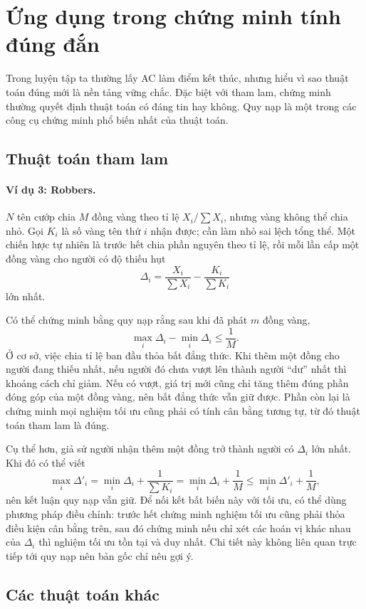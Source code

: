 \documentclass[11pt]{article}
\begin{document}
\section{Ứng dụng trong chứng minh tính đúng đắn}

Trong luyện tập ta thường lấy AC làm điểm kết thúc, nhưng hiểu vì sao thuật
toán đúng mới là nền tảng vững chắc. Đặc biệt với tham lam, chứng minh thường
quyết định thuật toán có đáng tin hay không. Quy nạp là một trong các công cụ
chứng minh phổ biến nhất của thuật toán.

\subsection{Thuật toán tham lam}

\paragraph{Ví dụ 3: Robbers.}
\(N\) tên cướp chia \(M\) đồng vàng theo tỉ lệ \(X_i/\sum X_i\), nhưng vàng
không thể chia nhỏ. Gọi \(K_i\) là số vàng tên thứ \(i\) nhận được; cần làm
nhỏ sai lệch tổng thể. Một chiến lược tự nhiên là trước hết chia phần nguyên
theo tỉ lệ, rồi mỗi lần cấp một đồng vàng cho người có độ thiếu hụt
\[
  \Delta_i=\frac{X_i}{\sum X_i}-\frac{K_i}{\sum K_i}
\]
lớn nhất.

Có thể chứng minh bằng quy nạp rằng sau khi đã phát \(m\) đồng vàng,
\[
  \max_i\Delta_i-\min_i\Delta_i\le \frac1M.
\]
Ở cơ sở, việc chia tỉ lệ ban đầu thỏa bất đẳng thức. Khi thêm một đồng cho
người đang thiếu nhất, nếu người đó chưa vượt lên thành người ``dư'' nhất thì
khoảng cách chỉ giảm. Nếu có vượt, giá trị mới cũng chỉ tăng thêm đúng phần
đóng góp của một đồng vàng, nên bất đẳng thức vẫn giữ được. Phần còn lại là
chứng minh mọi nghiệm tối ưu cũng phải có tính cân bằng tương tự, từ đó thuật
toán tham lam là đúng.

Cụ thể hơn, giả sử người nhận thêm một đồng trở thành người có
\(\Delta_i\) lớn nhất. Khi đó có thể viết
\[
  \max_i\Delta'_i
  =\min_i\Delta_i+\frac1{\sum K_i}
  =\min_i\Delta_i+\frac1M
  \le \min_i\Delta'_i+\frac1M,
\]
nên kết luận quy nạp vẫn giữ. Để nối kết bất biến này với tối ưu, có thể dùng
phương pháp điều chỉnh: trước hết chứng minh nghiệm tối ưu cũng phải thỏa
điều kiện cân bằng trên, sau đó chứng minh nếu chỉ xét các hoán vị khác nhau
của \(\Delta_i\) thì nghiệm tối ưu tồn tại và duy nhất. Chi tiết này không
liên quan trực tiếp tới quy nạp nên bản gốc chỉ nêu gợi ý.

\subsection{Các thuật toán khác}
\end{document}
